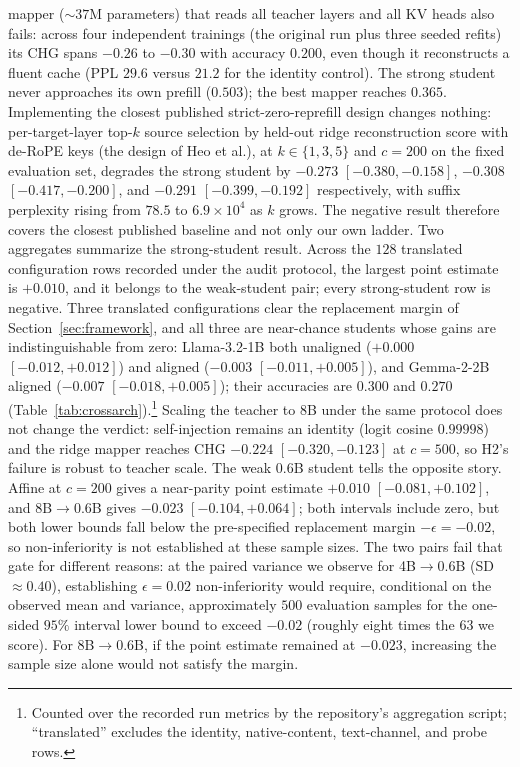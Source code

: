 \documentclass{article} %
\begin{document}
mapper ($\sim$$37$M parameters) that reads all teacher layers and all KV heads
also fails: across four independent trainings (the original run plus three
seeded refits) its CHG spans $-0.26$ to $-0.30$ with accuracy $0.200$, even
though it reconstructs a fluent cache (PPL $29.6$
versus $21.2$ for the identity control). The strong student never
approaches its own prefill ($0.503$); the best mapper reaches $0.365$.
Implementing the closest published strict-zero-reprefill design changes nothing:
per-target-layer top-$k$ source selection by held-out ridge reconstruction score
with de-RoPE keys (the design of Heo et al.), at $k\in\{1,3,5\}$ and $c{=}200$
on the fixed evaluation set, degrades the strong student by $-0.273$
$[-0.380,-0.158]$, $-0.308$ $[-0.417,-0.200]$, and $-0.291$
$[-0.399,-0.192]$ respectively, with suffix perplexity rising from $78.5$ to
$6.9\times10^{4}$ as $k$ grows. The negative result therefore covers the closest
published baseline and not only our own ladder. Two
aggregates summarize the strong-student result. Across the $128$ translated configuration
rows recorded under the audit protocol, the largest point estimate is $+0.010$,
and it belongs to the weak-student pair; every strong-student row is negative.
Three translated configurations clear the replacement margin of
Section~\ref{sec:framework}, and all three are near-chance students whose gains
are indistinguishable from zero: Llama-3.2-1B both unaligned ($+0.000$
$[-0.012, +0.012]$) and aligned ($-0.003$ $[-0.011, +0.005]$), and Gemma-2-2B
aligned ($-0.007$ $[-0.018, +0.005]$); their accuracies are $0.300$ and $0.270$
(Table~\ref{tab:crossarch}).\footnote{Counted over the recorded run metrics by the repository's
aggregation script; ``translated'' excludes the identity, native-content,
text-channel, and probe rows.} Scaling
the teacher to 8B under the same protocol does not change the verdict:
self-injection remains an identity (logit cosine $0.99998$) and the ridge
mapper reaches CHG $-0.224$ $[-0.320, -0.123]$ at $c{=}500$, so H2's failure
is robust to teacher scale. The
weak 0.6B student tells the opposite story. Affine at $c{=}200$ gives a
near-parity point estimate $+0.010$ $[-0.081, +0.102]$, and 8B$\to$0.6B gives
$-0.023$ $[-0.104, +0.064]$; both intervals include zero, but both lower
bounds fall below the pre-specified replacement margin $-\epsilon=-0.02$, so
non-inferiority is not established at these sample sizes. The two pairs fail
that gate for different reasons: at the paired variance we observe for
4B$\to$0.6B (SD $\approx 0.40$), establishing $\epsilon{=}0.02$
non-inferiority would require, conditional on the observed mean and variance,
approximately $500$ evaluation samples for the one-sided $95\%$ interval lower
bound to exceed $-0.02$ (roughly eight times the $63$ we score). For
8B$\to$0.6B, if the point estimate remained at $-0.023$, increasing the sample
size alone would not satisfy the margin.
\end{document}
